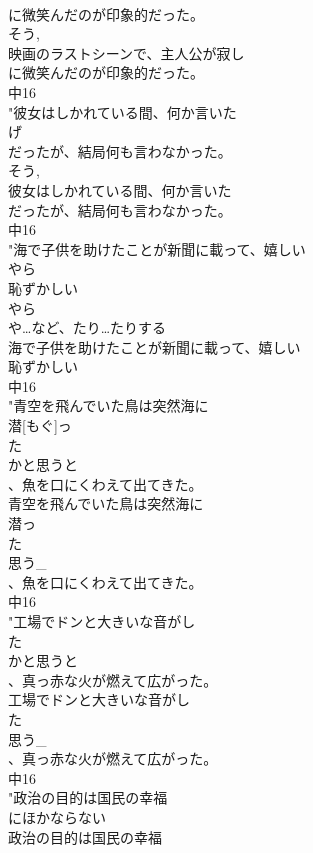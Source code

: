 \documentclass[8pt]{extreport}
\begin{document}
\begin{CJK}{UTF8}{min}
\\	に微笑んだのが印象的だった。
\\	そう, 
\\	映画のラストシーンで、主人公が寂し
\\	に微笑んだのが印象的だった。
\\	中16
\\	"彼女はしかれている間、何か言いた
\\	げ
\\	だったが、結局何も言わなかった。
\\	そう, 
\\	彼女はしかれている間、何か言いた
\\	だったが、結局何も言わなかった。
\\	中16
\\	"海で子供を助けたことが新聞に載って、嬉しい
\\	やら
\\	恥ずかしい
\\	やら
\\	や…など、たり…たりする　
\\	海で子供を助けたことが新聞に載って、嬉しい
\\	恥ずかしい
\\	中16
\\	"青空を飛んでいた鳥は突然海に
\\	潜[もぐ]っ
\\	た
\\	かと思うと
\\	、魚を口にくわえて出てきた。
\\	青空を飛んでいた鳥は突然海に
\\	潜っ
\\	た
\\	思う_
\\	、魚を口にくわえて出てきた。
\\	中16
\\	"工場でドンと大きいな音がし
\\	た
\\	かと思うと
\\	、真っ赤な火が燃えて広がった。
\\	工場でドンと大きいな音がし
\\	た
\\	思う_
\\	、真っ赤な火が燃えて広がった。
\\	中16
\\	"政治の目的は国民の幸福
\\	にほかならない
\\	政治の目的は国民の幸福

\end{CJK}
\end{document}
